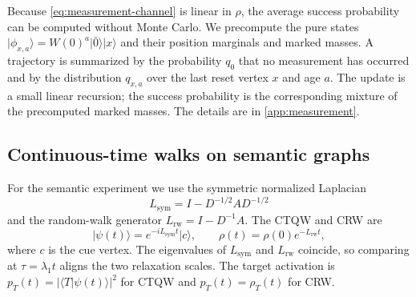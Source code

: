 Because \eqref{eq:measurement-channel} is linear in $\rho$, the average success
probability can be computed without Monte Carlo. We precompute the pure states
$\lvert\phi_{x,a}\rangle=W(0)^a\lvert\bar0\rangle\lvert x\rangle$ and their
position marginals and marked masses. A trajectory is summarized by the
probability $q_0$ that no measurement has occurred and by the distribution
$q_{x,a}$ over the last reset vertex $x$ and age $a$. The update is a small
linear recursion; the success probability is the corresponding mixture of the
precomputed marked masses. The details are in \cref{app:measurement}.

\subsection{Continuous-time walks on semantic graphs}
\label{sec:theory-ctqw}

For the semantic experiment we use the symmetric normalized Laplacian
\begin{equation}
  L_{\mathrm{sym}}=I-D^{-1/2}AD^{-1/2}
\end{equation}
and the random-walk generator
$L_{\mathrm{rw}}=I-D^{-1}A$. The CTQW and CRW are
\begin{equation}
  \lvert\psi(t)\rangle=e^{-iL_{\mathrm{sym}}t}\lvert c\rangle,
  \qquad
  \rho(t)=\rho(0)e^{-L_{\mathrm{rw}}t},
  \label{eq:ctqw-crw-theory}
\end{equation}
where $c$ is the cue vertex. The eigenvalues of $L_{\mathrm{sym}}$ and
$L_{\mathrm{rw}}$ coincide, so comparing at $\tau=\lambda_1t$ aligns the two
relaxation scales. The target activation is
$p_T(t)=\lvert\langle T\vert\psi(t)\rangle\rvert^2$ for CTQW and
$p_T(t)=\rho_T(t)$ for CRW.
